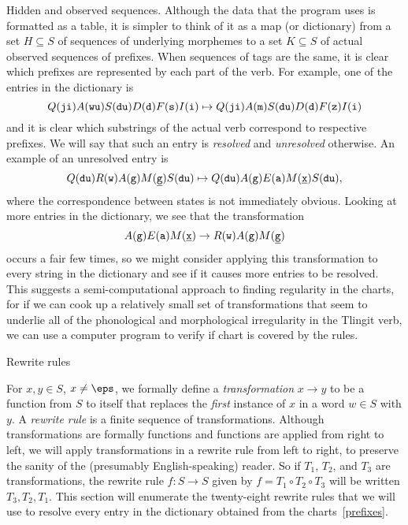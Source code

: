\medskip\boldlabel Hidden and observed sequences.
Although the data that the program uses is formatted as a table, it is simpler to think of it as a map (or
dictionary) from a set $H\subseteq S$ of sequences of underlying morphemes to a set $K\subseteq S$
of actual observed sequences of prefixes. When sequences of tags are the same, it is clear which prefixes
are represented by each part of the verb. For example, one of the entries in the dictionary is
$$Q({\tt ji})A({\tt wu})S({\tt du})D({\tt d})F({\tt s})I({\tt i})\mapsto Q({\tt ji})A({\tt m})S({\tt du})D({\tt d})F({\tt z})I({\tt i})$$
and it is clear which substrings of the actual verb correspond to respective prefixes. We will say that such
an entry is {\it resolved} and {\it unresolved} otherwise. An example of an unresolved entry is
$$Q({\tt du})R({\tt w})A({\tt g})M({\tt \underline{g}})S({\tt du})\mapsto Q({\tt du})A({\tt g})E({\tt a})M({\tt \underline{x}})S({\tt du}),$$
where the correspondence between states is not immediately obvious.
Looking at more entries in the dictionary, we see that the transformation
$$A({\tt g})E({\tt a})M({\tt \underline{x}}) \to R({\tt w})A({\tt g})M({\tt \underline{g}})$$
occurs a fair few times, so we might consider applying this transformation to every string in the dictionary
and see if it causes more entries to be resolved. This suggests a semi-computational approach to finding regularity
in the charts, for if we can cook up a relatively small set of transformations that seem to underlie
all of the phonological and morphological irregularity in the Tlingit verb, we can use a computer program to
verify if chart is covered by the rules.

\advsect Rewrite rules

For $x,y\in S$, $x\neq\eps$, we formally define a
{\it transformation} $x\to y$ to be a function from $S$ to itself that
replaces the {\it first} instance of $x$ in a word $w\in S$ with $y$. A {\it rewrite rule} is a finite sequence
of transformations. Although transformations are formally functions and functions are applied from right to left,
we will apply transformations in a rewrite rule from
left to right, to preserve the sanity of the (presumably English-speaking) reader. So
if $T_1$, $T_2$, and $T_3$ are transformations,
the rewrite rule $f:S\to S$ given by $f = T_1 \circ T_2 \circ T_3$ will be written $T_3, T_2, T_1$. This section
will enumerate the twenty-eight rewrite rules that we will use to resolve every entry in the dictionary obtained
from the charts~\ref{prefixes}.


